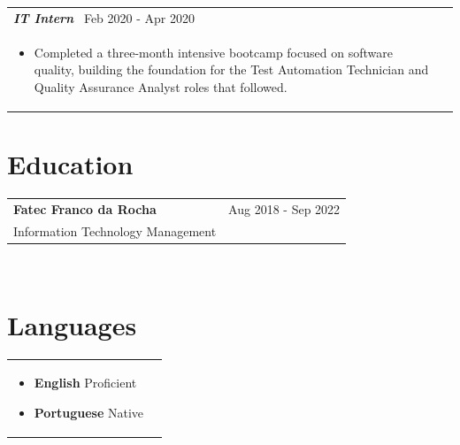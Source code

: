 \documentclass[a4paper,8pt]{article}
\begin{document}
\begin{tabularx}{\linewidth}{ @{}l r@{} }
\color[HTML]{371e77}\textbf{\textit{IT Intern}}\ \hfill \color[HTML]{4B28A4} Feb 2020 - Apr 2020 \\[5pt]
\begin{minipage}[t]{\linewidth}
    \begin{itemize}[nosep,after=\strut, leftmargin=2em, itemsep=2pt]
        \item Completed a three-month intensive bootcamp focused on software quality, building the foundation for the Test Automation Technician and Quality Assurance Analyst roles that followed.
    \end{itemize}
\end{minipage}
\end{tabularx}

\section{Education}
\begin{tabularx}{\linewidth}{ @{}l r@{} }
\color[HTML]{1C033C} \textbf{Fatec Franco da Rocha} & \hfill \color[HTML]{371e77} Aug 2018 - Sep 2022 \\
\color[HTML]{371e77} Information Technology Management & \hfill \color[HTML]{4B28A4} \textit{\textbf{}} \\
\end{tabularx}\\[3pt]

\section{Languages}
\begin{tabularx}{\linewidth}{ @{}l r@{} }
\begin{minipage}[t]{\linewidth}
    \begin{itemize}[nosep,after=\strut, leftmargin=2em, itemsep=2pt]
        \item \textbf{English} Proficient
         \item \textbf{Portuguese} Native
    \end{itemize}
    \end{minipage}
\end{tabularx}\\[3pt]

\end{document}
